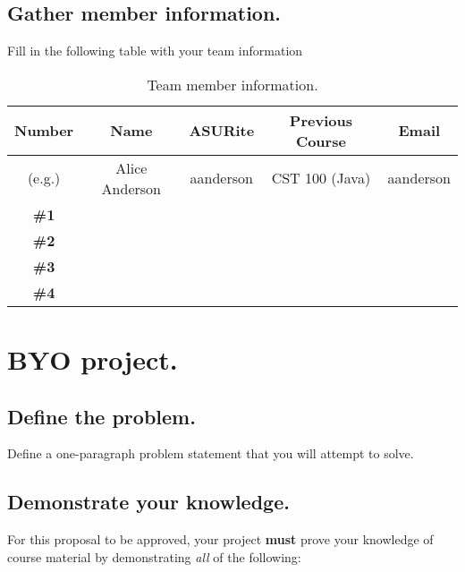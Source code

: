 \documentclass[12pt]{article}
\begin{document}
\subsection{Gather member information.}
Fill in the following table with your team information
\begin{table}[htdp]
\caption{Team member information.}
\begin{center}
\begin{tabular}{c c c c c}
\hline\hline
Number & Name & ASURite & Previous Course & Email \\ [.5ex]
\hline
(e.g.) & Alice Anderson & aanderson & CST 100 (Java) & aanderson \\
\hline
{\bf \#1} & & & & \\ [1ex]
{\bf \#2} & & & & \\ [1ex]
{\bf \#3} & & & & \\ [1ex]
{\bf \#4} & & & & \\ [1ex]
\hline
\end{tabular}
\end{center}
\label{table:team}
\end{table}

\pagebreak

\section{BYO project.}

\subsection{Define the problem.}

Define a one-paragraph problem statement that you will attempt to solve.

\subsection{Demonstrate your knowledge.}

For this proposal to be approved, your project {\bf must} prove your knowledge of course material by demonstrating {\it all} of the following:
\end{document}
